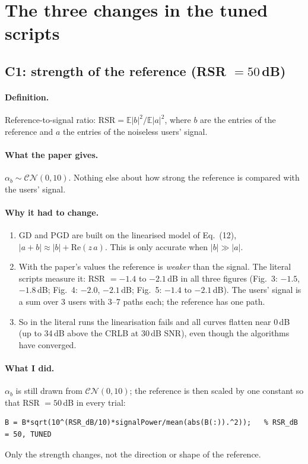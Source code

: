 \documentclass[11pt,a4paper]{article}
\newcommand{\E}{\mathbb{E}}
\begin{document}
\section{The three changes in the tuned scripts}
\label{sec:changes}

\subsection{C1: strength of the reference (RSR $=50$\,dB)}
\label{sec:c1}

\paragraph{Definition.} Reference-to-signal ratio:
$\text{RSR}=\E|b|^2/\E|a|^2$, where $b$ are the entries of the reference and $a$ the entries of the
noiseless users' signal.

\paragraph{What the paper gives.} $\alpha_b\sim\mathcal{CN}(0,10)$. Nothing else about how strong the
reference is compared with the users' signal.

\paragraph{Why it had to change.}
\begin{enumerate}[leftmargin=*,itemsep=1pt]
  \item GD and PGD are built on the linearised model of Eq.~(12),
        $|a+b|\approx|b|+\mathrm{Re}(z\,a)$. This is only accurate when $|b|\gg|a|$.
  \item With the paper's values the reference is \emph{weaker} than the signal. The literal scripts
        measure it: RSR $=-1.4$ to $-2.1$\,dB in all three figures
        (Fig.~3: $-1.5$, $-1.8$\,dB; Fig.~4: $-2.0$, $-2.1$\,dB; Fig.~5: $-1.4$ to $-2.1$\,dB).
        The users' signal is a sum over 3 users with 3--7 paths each; the reference has one path.
  \item So in the literal runs the linearisation fails and all curves flatten near 0\,dB
        (up to 34\,dB above the CRLB at 30\,dB SNR), even though the algorithms have converged.
\end{enumerate}

\paragraph{What I did.} $\alpha_b$ is still drawn from $\mathcal{CN}(0,10)$; the reference is then
scaled by one constant so that RSR $=50$\,dB in every trial:
\begin{lstlisting}
B = B*sqrt(10^(RSR_dB/10)*signalPower/mean(abs(B(:)).^2));   % RSR_dB = 50, TUNED
\end{lstlisting}
Only the strength changes, not the direction or shape of the reference.
\end{document}
